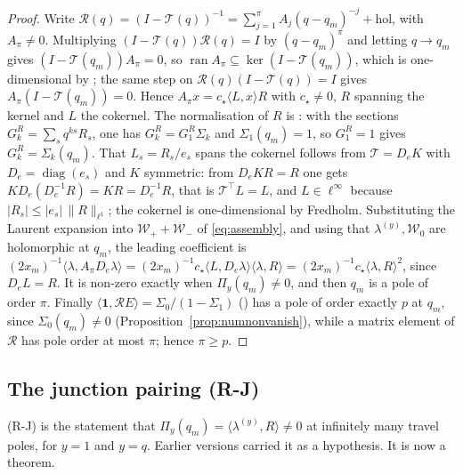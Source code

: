 \documentclass[11pt]{article}
\theoremstyle{plain}
\theoremstyle{definition}
\theoremstyle{remark}
\theoremstyle{plain}\newtheorem*{maintheorem}{Main Theorem}
\begin{document}
\begin{proof}
Write $\mathcal R(q)=(I-\mathcal T(q))^{-1}=\sum_{j=1}^{\pi}A_j(q-q_m)^{-j}+\text{hol}$, with
$A_\pi\ne0$. Multiplying $(I-\mathcal T(q))\mathcal R(q)=I$ by $(q-q_m)^{\pi}$ and letting
$q\to q_m$ gives $(I-\mathcal T(q_m))A_{\pi}=0$, so
$\operatorname{ran}A_{\pi}\subseteq\ker(I-\mathcal T(q_m))$, which is one-dimensional by
{\cite[Lemma ``the null space is at most one-dimensional'', \textup{lem:nullspace}]{Bonfioli2026bB}}; the same step on $\mathcal R(q)(I-\mathcal T(q))=I$ gives
$A_{\pi}(I-\mathcal T(q_m))=0$. Hence $A_\pi x=c_\star\langle L,x\rangle R$ with $c_\star\ne0$,
$R$ spanning the kernel and $L$ the cokernel. The normalisation of $R$ is
{\cite[Lemma ``the null space is at most one-dimensional'', \textup{lem:nullspace}]{Bonfioli2026bB}}: with the sections $G^R_k=\sum_sq^{ks}R_s$, one has $G^R_k=G^R_1\Sigma_k$ and $\Sigma_1(q_m)=1$, so $G^R_1=1$ gives
$G^R_k=\Sigma_k(q_m)$. That $L_s=R_s/e_s$ spans the cokernel follows from
$\mathcal T=D_eK$ with $D_e=\operatorname{diag}(e_s)$ and $K$ symmetric: from $D_eKR=R$ one gets
$KD_e(D_e^{-1}R)=KR=D_e^{-1}R$, that is $\mathcal T^{\!\top}L=L$, and $L\in\ell^\infty$ because
$|R_s|\le|e_s|\,\|R\|_{\ell^1}$; the cokernel is one-dimensional by Fredholm. Substituting the
Laurent expansion into $\mathcal W_++\mathcal W_-$ of \eqref{eq:assembly}, and using that
$\lambda^{(y)},\mathcal W_0$ are holomorphic at $q_m$, the leading coefficient is
$(2x_m)^{-1}\langle\lambda,A_\pi D_e\lambda\rangle=(2x_m)^{-1}c_\star\langle L,D_e\lambda\rangle
\langle\lambda,R\rangle=(2x_m)^{-1}c_\star\langle\lambda,R\rangle^2$, since $D_eL=R$. It is
non-zero exactly when $\Pi_y(q_m)\ne0$, and then $q_m$ is a pole of order $\pi$. Finally
$\langle\mathbf 1,\mathcal RE\rangle=\Sigma_0/(1-\Sigma_1)$ ({\cite[Proposition ``the travel $k$-sum telescopes'', \textup{prop:travelsum}]{Bonfioli2026bB}}) has
a pole of order exactly $p$ at $q_m$, since $\Sigma_0(q_m)\ne0$
(Proposition~\ref{prop:numnonvanish}), while a matrix element of $\mathcal R$ has pole order at
most $\pi$; hence $\pi\ge p$.
\end{proof}

\subsection{The junction pairing \textup{(R-J)}}\label{sec:RJ}

\textup{(R-J)} is the statement that $\Pi_y(q_m)=\langle\lambda^{(y)},R\rangle\ne0$ at infinitely
many travel poles, for $y=1$ and $y=q$. Earlier versions carried it as a hypothesis. It is now a
theorem.
\end{document}
